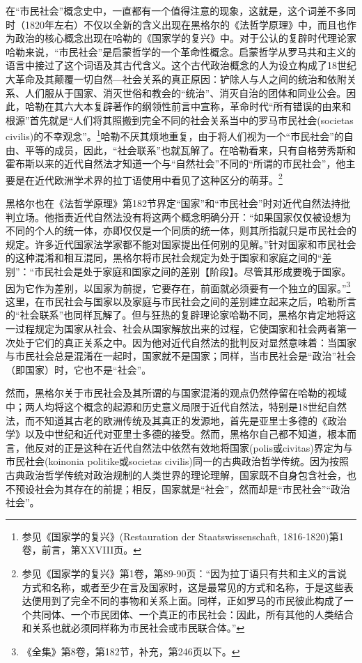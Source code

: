 在“市民社会”概念史中，一直都有一个值得注意的现象，这就是，这个词差不多同时（1820年左右）不仅以全新的含义出现在黑格尔的《法哲学原理》中，而且也作为政治的核心概念出现在哈勒的《国家学的复兴》中。对于公认的复辟时代理论家哈勒来说，“市民社会”是启蒙哲学的一个革命性概念。启蒙哲学从罗马共和主义的语言中接过了这个词语及其古代含义。这个古代政治概念的人为设立构成了18世纪大革命及其颠覆一切自然—社会关系的真正原因：铲除人与人之间的统治和依附关系、人们服从于国家、消灭世俗和教会的“统治”、消灭自治的团体和同业公会。因此，哈勒在其六大本复辟著作的纲领性前言中宣称，革命时代“所有错误的由来和根源”首先就是“人们将其照搬到完全不同的社会关系当中的罗马市民社会(societas civilis)的不幸观念”。\footnote{参见《国家学的复兴》(Restauration der Staatswissenschaft, 1816-1820)第1卷，前言，第XXVIII页。}哈勒不厌其烦地重复，由于将人们视为一个“市民社会”的自由、平等的成员，因此，“社会联系”也就瓦解了。在哈勒看来，只有自格劳秀斯和霍布斯以来的近代自然法才知道一个与“自然社会”不同的“所谓的市民社会”，他主要是在近代欧洲学术界的拉丁语使用中看见了这种区分的萌芽。\footnote{参见《国家学的复兴》第1卷，第89-90页：“因为拉丁语只有共和主义的言说方式和名称，或者至少在言及国家时，这是最常见的方式和名称，于是这些表达便用到了完全不同的事物和关系上面。同样，正如罗马的市民彼此构成了一个共同体、一个市民团体、一个真正的市民社会：因此，所有其他的人类结合和关系也就必须同样称为市民社会或市民联合体。”}

黑格尔也在《法哲学原理》第182节界定“国家”和“市民社会”时对近代自然法持批判立场。他指责近代自然法没有将这两个概念明确分开：“如果国家仅仅被设想为不同的个人的统一体，亦即仅仅是一个同质的统一体，则其所指就只是市民社会的规定。许多近代国家法学家都不能对国家提出任何别的见解。”针对国家和市民社会的这种混淆和相互混同，黑格尔将市民社会规定为处于国家和家庭之间的“差别”：“市民社会是处于家庭和国家之间的差别【阶段】。尽管其形成要晚于国家。因为它作为差别，以国家为前提，它要存在，前面就必须要有一个独立的国家。”\footnote{《全集》第8卷，第182节，补充，第246页以下。}这里，在市民社会与国家以及家庭与市民社会之间的差别建立起来之后，哈勒所言的“社会联系”也同样瓦解了。但与狂热的复辟理论家哈勒不同，黑格尔肯定地将这一过程规定为国家从社会、社会从国家解放出来的过程，它使国家和社会两者第一次处于它们的真正关系之中。因为他对近代自然法的批判反对显然意味着：当国家与市民社会总是混淆在一起时，国家就不是国家；同样，当市民社会是“政治”社会（即国家）时，它也不是“社会”。

然而，黑格尔关于市民社会及其所谓的与国家混淆的观点仍然停留在哈勒的视域中；两人均将这个概念的起源和历史意义局限于近代自然法，特别是18世纪自然法，而不知道其古老的欧洲传统及其真正的发源地，首先是亚里士多德的《政治学》以及中世纪和近代对亚里士多德的接受。然而，黑格尔自己都不知道，根本而言，他反对的正是这种在近代自然法中依然有效地将国家(polis或civitas)界定为与市民社会(koinonia politike或societas civilis)同一的古典政治哲学传统。因为按照古典政治哲学传统对政治规制的人类世界的理论理解，国家既不自身包含社会，也不预设社会为其存在的前提；相反，国家就是“社会”，然而却是“市民社会”“政治社会”。

